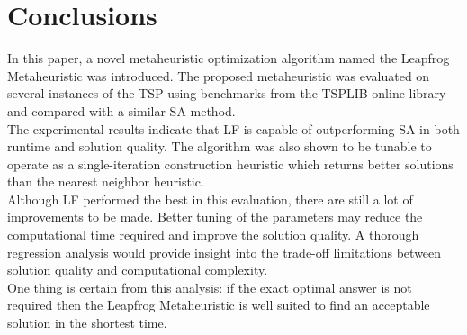 \documentclass[12pt,letterpaper,oneside]{book}
\begin{document}
\chapter{Conclusions}
In this paper, a novel metaheuristic optimization algorithm named the Leapfrog Metaheuristic was introduced. The proposed metaheuristic was evaluated on several instances of the TSP using benchmarks from the TSPLIB online library and compared with a similar SA method.\\
The experimental results indicate that LF is capable of outperforming SA in both runtime and solution quality. The algorithm was also shown to be tunable to operate as a single-iteration construction heuristic which returns better solutions than the nearest neighbor heuristic.\\
Although LF performed the best in this evaluation, there are still a lot of improvements to be made. Better tuning of the parameters may reduce the computational time required and improve the solution quality. A thorough regression analysis would provide insight into the trade-off limitations between solution quality and computational complexity.\\
One thing is certain from this analysis: if the exact optimal answer is not required then the Leapfrog Metaheuristic is well suited to find an acceptable solution in the shortest time.
\end{document}
